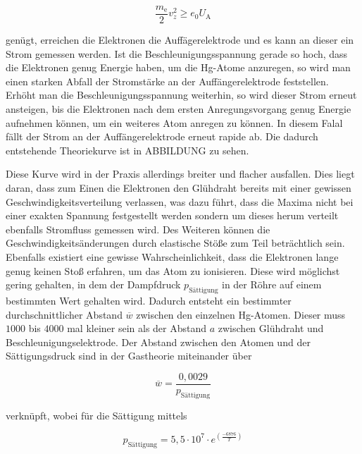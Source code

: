 \begin{equation}
    \label{eqn:min-vel}
    \frac{m_\text{e}}{2} v_z^2 \geq e_0 U_\text{A}
\end{equation}

genügt, erreichen die Elektronen die Auffägerelektrode und es kann an dieser ein Strom gemessen werden.
Ist die Beschleunigungsspannung gerade so hoch, dass die Elektronen genug Energie haben, um die Hg-Atome anzuregen, so wird man einen starken Abfall der Stromstärke an der Auffängerelektrode feststellen.
Erhöht man die Beschleunigungsspannung weiterhin, so wird dieser Strom erneut ansteigen, bis die Elektronen nach dem ersten Anregungsvorgang genug Energie aufnehmen können, um ein weiteres Atom anregen zu können.
In diesem Falal fällt der Strom an der Auffängerelektrode erneut rapide ab.
Die dadurch entstehende Theoriekurve ist in ABBILDUNG zu sehen.

Diese Kurve wird in der Praxis allerdings breiter und flacher ausfallen.
Dies liegt daran, dass zum Einen die Elektronen den Glühdraht bereits mit einer gewissen Geschwindigkeitsverteilung verlassen, was dazu führt, dass die Maxima nicht bei einer exakten Spannung festgestellt werden sondern um dieses herum verteilt ebenfalls Stromfluss gemessen wird.
Des Weiteren können die Geschwindigkeitsänderungen durch elastische Stöße zum Teil beträchtlich sein.
Ebenfalls existiert eine gewisse Wahrscheinlichkeit, dass die Elektronen lange genug keinen Stoß erfahren, um das Atom zu ionisieren.
Diese wird möglichst gering gehalten, in dem der Dampfdruck $p_\text{Sättigung}$ in der Röhre auf einem bestimmten Wert gehalten wird. Dadurch entsteht ein bestimmter durchschnittlicher Abstand $\overline{w}$ zwischen den einzelnen Hg-Atomen.
Dieser muss $1000$ bis $4000$ mal kleiner sein als der Abstand $a$ zwischen Glühdraht und Beschleunigungselektrode. Der Abstand zwischen den Atomen und der Sättigungsdruck sind in der Gastheorie miteinander über

\begin{equation}
    \label{eqn:druck-abstand}
    \overline{w} = \frac{0,0029}{p_\text{Sättigung}}
\end{equation}

verknüpft, wobei für die Sättigung mittels

\begin{equation}
    \label{eqn:saettigung}
    p_\text{Sättigung} = 5,5 \cdot 10^7 \cdot e^(\frac{-6876}{T})
\end{equation}

